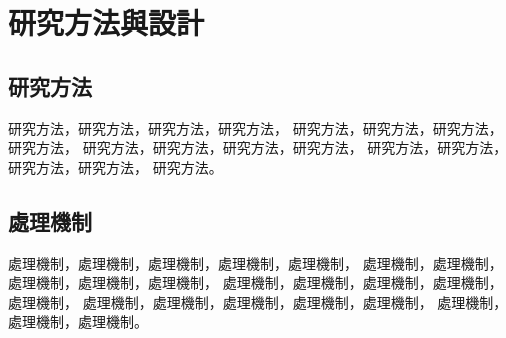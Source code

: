\chapter{研究方法與設計}
\label{chapter:method}

\section{研究方法}
    研究方法，研究方法，研究方法，研究方法，
    研究方法，研究方法，研究方法，研究方法，
    研究方法，研究方法，研究方法，研究方法，
    研究方法，研究方法，研究方法，研究方法，
    研究方法。

\section{處理機制}
    處理機制，處理機制，處理機制，處理機制，處理機制，
    處理機制，處理機制，處理機制，處理機制，處理機制，
    處理機制，處理機制，處理機制，處理機制，處理機制，
    處理機制，處理機制，處理機制，處理機制，處理機制，
    處理機制，處理機制，處理機制。

